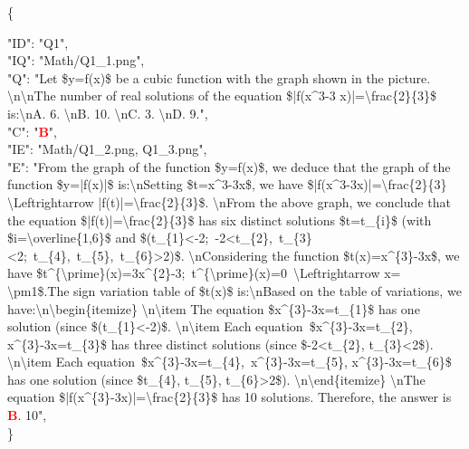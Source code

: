 \documentclass{article}
\begin{document}
{	\begin{multicols}{2}	
		\{
		
		"ID": "Q1", \\
		"IQ": "Math/Q1\_1.png", \\
		"Q": "Let \$y=f(x)\$ be a cubic function with the graph shown in the picture. \textbackslash{}n\textbackslash{}nThe number of real solutions of the equation \$|f(x\textasciicircum3-3 x)|=\textbackslash{}frac\{2\}\{3\}\$ is:\textbackslash{}nA. 6.    \textbackslash{}nB. 10. \textbackslash{}nC. 3. \textbackslash{}nD. 9.", \\
		"C": "\textcolor{red}{\textbf{B}}", \\
		"IE": "Math/Q1\_2.png, Q1\_3.png", \\
		"E": "From the graph of the function \$y=f(x)\$, we deduce that the graph of the function \$y=|f(x)|\$ is:\textbackslash{}nSetting \$t=x\textasciicircum3-3x\$, we have \$|f(x\textasciicircum3-3x)|=\textbackslash{}frac\{2\}\{3\} \textbackslash{}Leftrightarrow |f(t)|=\textbackslash{}frac\{2\}\{3\}\$. \textbackslash{}nFrom the above graph, we conclude that the equation \$|f(t)|=\textbackslash{}frac\{2\}\{3\}\$ has six distinct solutions \$t=t\_\{i\}\$ (with \$i=\textbackslash{}overline\{1,6\}\$ and \$(t\_\{1\}<-2;~-2<t\_\{2\},~t\_\{3\}<2;~t\_\{4\},~t\_\{5\},~t\_\{6\}>2)\$. \textbackslash{}nConsidering the function \$t(x)=x\textasciicircum\{3\}-3x\$, we have \$t\textasciicircum\{\textbackslash{prime}\}(x)=3x\textasciicircum\{2\}-3;~t\textasciicircum\{\textbackslash{}prime\}(x)=0~\textbackslash{}Leftrightarrow x= \textbackslash{}pm1\$.The sign variation table of \$t(x)\$ is:\textbackslash{}nBased on the table of variations, we have:\textbackslash{}n\textbackslash{}begin\{itemize\} \textbackslash{}n\textbackslash{}item The equation \$x\textasciicircum\{3\}-3x=t\_\{1\}\$ has one solution (since \$(t\_\{1\}<-2)\$. \textbackslash{}n\textbackslash{}item Each equation~\$x\textasciicircum\{3\}-3x=t\_\{2\}, x\textasciicircum\{3\}-3x=t\_\{3\}\$ has three distinct solutions (since \$-2<t\_\{2\}, t\_\{3\}<2\$). \textbackslash{}n\textbackslash{}item Each equation~\$x\textasciicircum\{3\}-3x=t\_\{4\},~x\textasciicircum\{3\}-3x=t\_\{5\}, x\textasciicircum\{3\}-3x=t\_\{6\}\$ has one solution (since \$t\_\{4\}, t\_\{5\}, t\_\{6\}>2\$). \textbackslash{}n\textbackslash{}end\{itemize\} \textbackslash{}nThe equation \$|f(x\textasciicircum\{3\}-3x)|=\textbackslash{}frac\{2\}\{3\}\$ has 10 solutions. Therefore, the answer is \textcolor{red}{\textbf{B}}. 10", \\
		\}
		

\end{multicols}}
\end{document}
